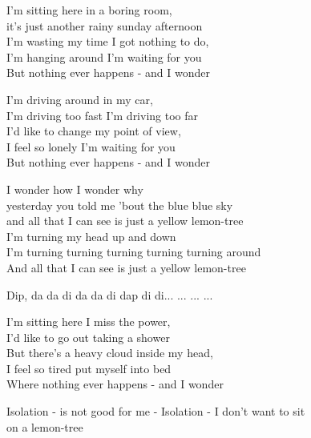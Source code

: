 
\ve{}
I'm sitting here in a boring room,\\
it's just another rainy sunday afternoon\\
I'm wasting my time I got nothing to do,\\
I'm hanging around I'm waiting for you\\
But nothing ever happens - and I wonder

\ve{}
I'm driving around in my car,\\
I'm driving too fast I'm driving too far\\
I'd like to change my point of view,\\
I feel so lonely I'm waiting for you\\
But nothing ever happens - and I wonder

\cho{}
I wonder how I wonder why\\
yesterday you told me 'bout the blue blue sky\\
and all that I can see is just a yellow lemon-tree \\
I'm turning my head up and down\\
I'm turning turning turning turning turning around\\
And all that I can see is just a yellow lemon-tree 

\re{*:}
Dip, da da di da da di dap di di... ... ... ...

\ve{}
I'm sitting here I miss the power,\\
I'd like to go out taking a shower\\
But there's a heavy cloud inside my head,\\
I feel so tired put myself into bed\\
Where nothing ever happens - and I wonder

\re{*:}
Isolation - is not good for me - Isolation - I don't want to sit\\
on a lemon-tree

\cho{}

\esong{}
